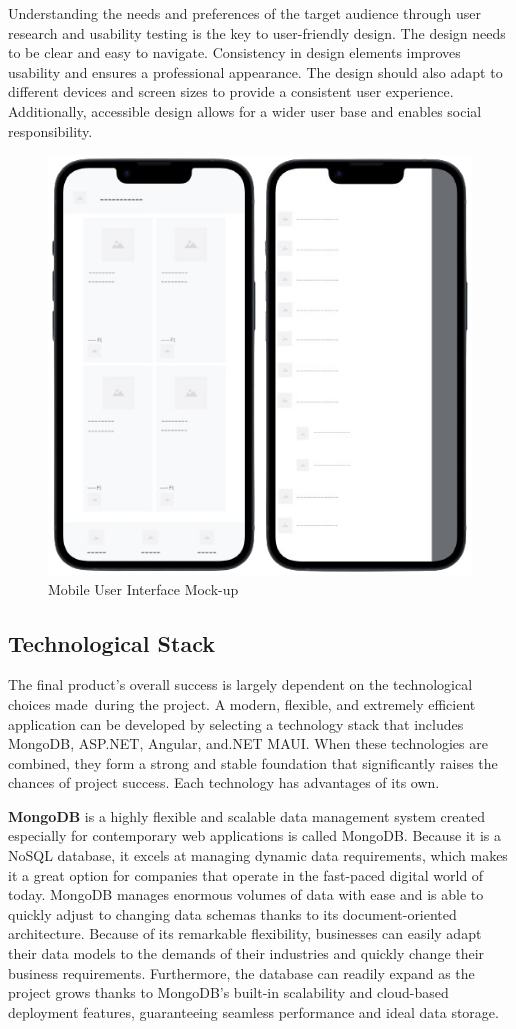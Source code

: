 Understanding the needs and preferences of the target audience through user research and usability testing is the key to user-friendly design. The design needs to be clear and easy to navigate. Consistency in design elements improves usability and ensures a professional appearance. The design should also adapt to different devices and screen sizes to provide a consistent user experience. Additionally,  accessible design allows for a wider user base and enables social responsibility. \cite{userFriendly}

\begin{figure}[H]
	\centering
	\includegraphics[width=0.3\linewidth]{img/ui_mockup.png}
	\caption{Mobile User Interface Mock-up}
	\label{fig:ur5}
\end{figure}

\subsection{Technological Stack}

The final product's overall success is largely dependent on the technological choices made during the project. A modern, flexible, and extremely efficient application can be developed by selecting a technology stack that includes MongoDB, ASP.NET, Angular, and.NET MAUI. When these technologies are combined, they form a strong and stable foundation that significantly raises the chances of project success. Each technology has advantages of its own.

\textbf{MongoDB} is a highly flexible and scalable data management system created especially for contemporary web applications is called {MongoDB}. Because it is a NoSQL database, it excels at managing dynamic data requirements, which makes it a great option for companies that operate in the fast-paced digital world of today. MongoDB manages enormous volumes of data with ease and is able to quickly adjust to changing data schemas thanks to its document-oriented architecture. Because of its remarkable flexibility, businesses can easily adapt their data models to the demands of their industries and quickly change their business requirements. Furthermore, the database can readily expand as the project grows thanks to MongoDB's built-in scalability and cloud-based deployment features, guaranteeing seamless performance and ideal data storage.

